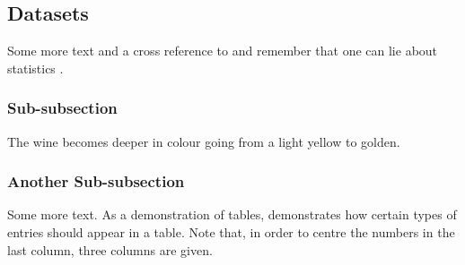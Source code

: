 \documentclass{ece}
\begin{document}
\subsection{Datasets}


Some more text and a cross reference to  and remember that one can lie about statistics \cite{liewithstat}.

\subsubsection{Sub-subsection}

%

The wine becomes deeper in colour going from a light yellow to golden.
\subsubsection{Another Sub-subsection}

Some more text.  As a demonstration of tables,  demonstrates how certain types of entries should appear in a table.  Note that, in order to centre the numbers in the last column, three columns are given.
\end{document}
